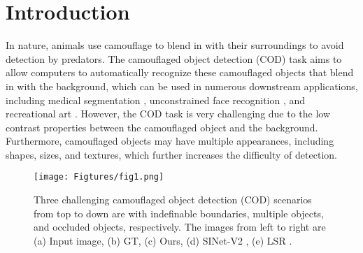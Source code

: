 \documentclass[sigconf,screen]{acmart}
\begin{document}
\maketitle

\section{Introduction}

In nature, animals use camouflage to blend in with their surroundings to avoid detection by predators. The camouflaged object detection (COD) task aims to allow computers to automatically recognize these camouflaged objects that blend in with the background, which can be used in numerous downstream applications, including medical segmentation \cite{r24,crm/tip20/MCMT-GAN,crm/tce22/covid,crm/tim22/covid}, unconstrained face recognition \cite{chen2023weighted}, and recreational art \cite{r30,r31}.
However, the COD task is very challenging due to the low contrast properties between the camouflaged object and the background.
Furthermore, camouflaged objects may have multiple appearances, including shapes, sizes, and textures, which further increases the difficulty of detection.
\begin{figure}[!t]
\centering
\texttt{[image: Figtures/fig1.png]}
\caption{ Three challenging camouflaged object detection (COD) scenarios from top to down are with indefinable boundaries, multiple objects, and occluded objects, respectively. The images from left to right are (a) Input image, (b) GT, (c) Ours, (d) SINet-V2 \cite{r53}, (e) LSR \cite{r38}.}
\label{fig:1}
\end{figure}
\end{document}
